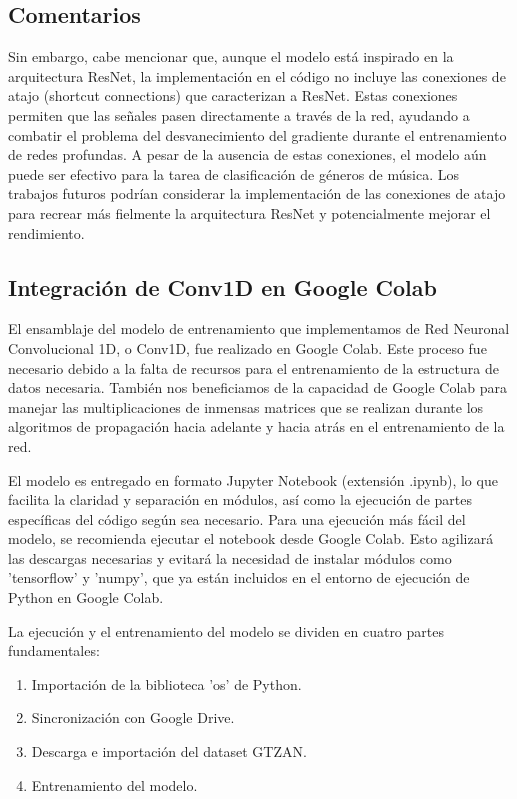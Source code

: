 \documentclass[colorinlistoftodos,twoside,twocolumn,10pt]{article} %
\begin{document}
\subsection{Comentarios}
Sin embargo, cabe mencionar que, aunque el modelo est\'a inspirado en la arquitectura ResNet, la implementaci\'on en el c\'odigo no incluye las conexiones de atajo (shortcut connections) que caracterizan a ResNet. Estas conexiones permiten que las se\~nales pasen directamente a trav\'es de la red, ayudando a combatir el problema del desvanecimiento del gradiente durante el entrenamiento de redes profundas. A pesar de la ausencia de estas conexiones, el modelo a\'un puede ser efectivo para la tarea de clasificaci\'on de g\'eneros de m\'usica. Los trabajos futuros podr\'ian considerar la implementaci\'on de las conexiones de atajo para recrear m\'as fielmente la arquitectura ResNet y potencialmente mejorar el rendimiento.

\subsection*{Integraci\'on de Conv1D en Google Colab}

El ensamblaje del modelo de entrenamiento que implementamos de Red Neuronal Convolucional 1D, o Conv1D, fue realizado en Google Colab. Este proceso fue necesario debido a la falta de recursos para el entrenamiento de la estructura de datos necesaria. Tambi\'en nos beneficiamos de la capacidad de Google Colab para manejar las multiplicaciones de inmensas matrices que se realizan durante los algoritmos de propagaci\'on hacia adelante y hacia atr\'as en el entrenamiento de la red.

El modelo es entregado en formato Jupyter Notebook (extensi\'on .ipynb), lo que facilita la claridad y separaci\'on en m\'odulos, as\'i como la ejecuci\'on de partes espec\'ificas del c\'odigo seg\'un sea necesario. Para una ejecuci\'on m\'as f\'acil del modelo, se recomienda ejecutar el notebook desde Google Colab. Esto agilizar\'a las descargas necesarias y evitar\'a la necesidad de instalar m\'odulos como 'tensorflow' y 'numpy', que ya est\'an incluidos en el entorno de ejecuci\'on de Python en Google Colab.

La ejecuci\'on y el entrenamiento del modelo se dividen en cuatro partes fundamentales:

\begin{enumerate}
\item Importaci\'on de la biblioteca 'os' de Python.
\item Sincronizaci\'on con Google Drive.
\item Descarga e importaci\'on del dataset GTZAN.
\item Entrenamiento del modelo.
\end{enumerate}
\end{document}
